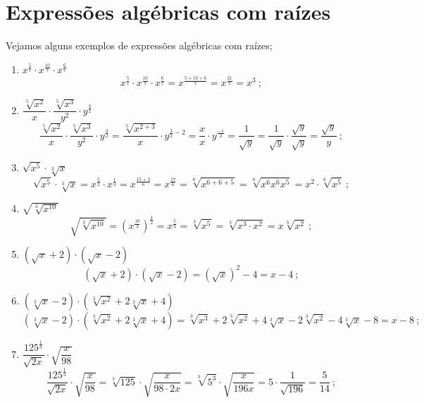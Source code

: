  \newpage
 \section{Expressões algébricas com raízes}
 
 \begin{exem} Vejamos alguns exemplos de expressões algébricas com raízes;
  \begin{enumerate}
   \item $x^{\frac{5}{7}} \cdot x^{\frac{10}{7}} \cdot x^{\frac{6}{7}}$
   \[x^{\frac{5}{7}} \cdot x^{\frac{10}{7}} \cdot x^{\frac{6}{7}}= x^{\frac{5+10+6}{7}}= x^{\frac{21}{7}}= x^3 \ ;\]
   
   \item $\dfrac{\sqrt[5]{x^2}}{x} \cdot \dfrac{\sqrt[5]{x^3}}{y^2} \cdot y^{\frac{3}{2}}$
   \[\dfrac{\sqrt[5]{x^2}}{x} \cdot \dfrac{\sqrt[5]{x^3}}{y^2} \cdot y^{\frac{3}{2}}= \dfrac{\sqrt[5]{x^{2+3}}}{x} \cdot y^{\frac{3}{2} - 2}= \dfrac{x}{x} \cdot y^{\frac{-1}{2}}= \dfrac{1}{\sqrt{y}}= \dfrac{1}{\sqrt{y}} \cdot \dfrac{\sqrt{y}}{\sqrt{y}}= \dfrac{\sqrt{y}}{y} \ ;\]
   
   \item $\sqrt{x^5} \cdot \sqrt[3]{x}$
   \[\sqrt{x^5} \cdot \sqrt[3]{x}= x^{\frac{5}{2}} \cdot x^{\frac{1}{3}}= x^{\frac{15+2}{6}} = x^{\frac{17}{6}} = \sqrt[6]{x^{6+6+5}}= \sqrt[6]{x^6 x^6 x^5} =  x^2 \cdot \sqrt[6]{x^5} \ ;\]
   
   \item $\sqrt{\sqrt[3]{x^{10}}}$
   \[\sqrt{\sqrt[3]{x^{10}}}= (x^{\frac{10}{3}})^{\frac{1}{2}}= x^{\frac{5}{3}}= \sqrt[3]{x^5}= \sqrt[3]{x^3 \cdot x^2}= x \sqrt[3]{x^2} \ ;\]
   
   \item $(\sqrt{x} + 2) \cdot (\sqrt{x} - 2)$
   \[(\sqrt{x} + 2) \cdot (\sqrt{x} - 2)= (\sqrt{x})^2 - 4= x-4 \ ;\]
   
   \item $(\sqrt[3]{x} - 2) \cdot (\sqrt[3]{x^2} + 2 \sqrt[3]{x} + 4)$
   \[(\sqrt[3]{x} - 2) \cdot (\sqrt[3]{x^2} + 2 \sqrt[3]{x} + 4)= \sqrt[3]{x^3} + 2\sqrt[3]{x^2} + 4 \sqrt[3]{x} - 2\sqrt[3]{x^2}- 4 \sqrt[3]{x} - 8= x - 8 \ ;\]
   
   \item $\dfrac{125^{\frac{1}{3}}}{\sqrt{2x}} \cdot \sqrt{\dfrac{x}{98}}$
   \[\dfrac{125^{\frac{1}{3}}}{\sqrt{2x}} \cdot \sqrt{\dfrac{x}{98}}= \sqrt[3]{125} \cdot \sqrt{\dfrac{x}{98 \cdot 2x}}= \sqrt[3]{5^3} \cdot \sqrt{\dfrac{x}{196x}}= 5 \cdot \dfrac{1}{\sqrt{196}}= \dfrac{5}{14} \ ;\]
   

\end{enumerate}
\end{exem}
